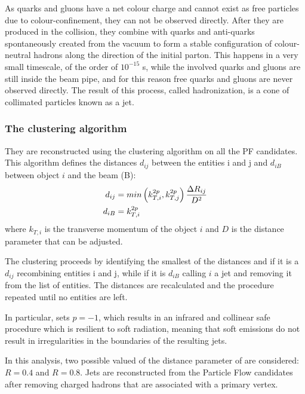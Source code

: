 As quarks and gluons have a net colour charge and cannot exist as free particles due to colour-confinement, they can not be observed directly.
After they are produced in the collision, they combine with quarks and anti-quarks spontaneously created from the vacuum
to form a stable configuration of colour-neutral hadrons along the direction of the initial parton.
This happens in a very small timescale, of the order of $10^{-15}$ s, while the involved quarks and gluons are still inside the beam pipe,
and for this reason free quarks and gluons are never observed directly.
The result of this process, called hadronization, is a cone of collimated particles known as a jet.

\subsubsection[The anti-kt clustering algorithm]{The \antikt clustering algorithm} %

They are reconstructed using the \antikt clustering algorithm \cite{Cacciari:2008gp} on all the PF candidates.
This algorithm defines the distances $d_{ij}$ between the entities i and j and $d_{iB}$ between object $i$ and the beam (B):
\begin{equation}
\begin{split}
d_{ij} &= min \left( k^{2p}_{T,i}, k^{2p}_{T,j} \right) \frac{\Delta R_{ij}}{D^2}\\
d_{iB} &= k^{2p}_{T,i}
\end{split}
\end{equation}
where $k_{T, i}$ is the transverse momentum of the object $i$ and $D$ is the distance parameter that can be adjusted.

The clustering proceeds by identifying the smallest of the distances and if it is a $d_{ij}$ recombining entities i and j,
while if it is $d_{iB}$ calling $i$ a jet and removing it from the list of entities.
The distances are recalculated and the procedure repeated until no entities are left.

In particular, \antikt sets $p = -1$, which results in an infrared and collinear safe procedure which is resilient to soft radiation,
meaning that soft emissions do not result in irregularities in the boundaries of the resulting jets.

In this analysis, two possible valued of the distance parameter of \antikt are considered: $R = 0.4$ and $R = 0.8$.
Jets are reconstructed from the Particle Flow candidates after removing charged hadrons that are associated with a \pileup{} primary vertex.

